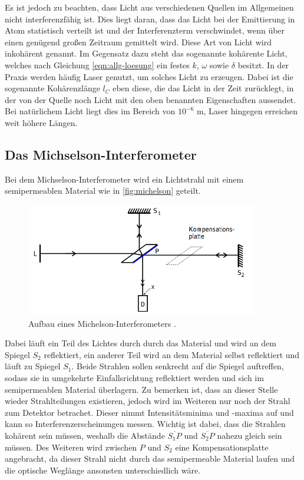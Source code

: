 Es ist jedoch zu beachten, dass Licht aus verschiedenen Quellen im Allgemeinen nicht interferenzfähig ist.
Dies liegt daran, dass das Licht bei der Emittierung in Atom statistisch verteilt ist und der Interferenzterm verschwindet, wenn über einen genügend großen Zeitraum gemittelt wird.
Diese Art von Licht wird inkohärent genannt. Im Gegensatz dazu steht das sogenannte kohärente Licht, welches nach Gleichung \eqref{eqn:allg-loesung} ein festes $k$, $\omega$ sowie $\delta$ besitzt.
In der Praxis werden häufig Laser genutzt, um solches Licht zu erzeugen.
Dabei ist die sogenannte Kohärenzlänge $l_C$ eben diese, die das Licht in der Zeit zurücklegt, in der von der Quelle noch Licht mit den oben benannten Eigenschaften aussendet.
Bei natürlichem Licht liegt dies im Bereich von $10^{-6}$ m, Laser hingegen erreichen weit höhere Längen.

\subsection{Das Michselson-Interferometer}

Bei dem Michselson-Interferometer wird ein Lichtstrahl mit einem semipermeablen Material wie in \autoref{fig:michelson} geteilt.

\begin{figure}
    \centering
    \includegraphics[width=0.9\textwidth]{content/michelson.png}
    \caption{Aufbau eines Michelson-Interferometers \cite{V401}.}
    \label{fig:michelson}
\end{figure}

Dabei läuft ein Teil des Lichtes durch durch das Material und wird an dem Spiegel $S_2$ reflektiert, ein anderer Teil wird an dem Material selbst reflektiert und läuft zu Spiegel $S_1$.
Beide Strahlen sollen senkrecht auf die Spiegel auftreffen, sodass sie in umgekehrte Einfallsrichtung reflektiert werden und sich im semipermeablen Material überlagern. Zu bemerken ist, dass an dieser Stelle wieder Strahlteilungen existieren, jedoch wird im Weiteren nur noch der Strahl zum Detektor betrachet.
Dieser nimmt Intensitätsminima und -maxima auf und kann so Interferenzerscheinungen messen.
Wichtig ist dabei, dass die Strahlen kohärent sein müssen, weshalb die Abstände $\overline{S_1P}$ und $\overline{S_2P}$ nahezu gleich sein müssen.
Des Weiteren wird zwischen $P$ und $S_2$ eine Kompensationsplatte angebracht, da dieser Strahl nicht durch das semipermeable Material laufen und die optische Weglänge ansonsten unterschiedlich wäre.

